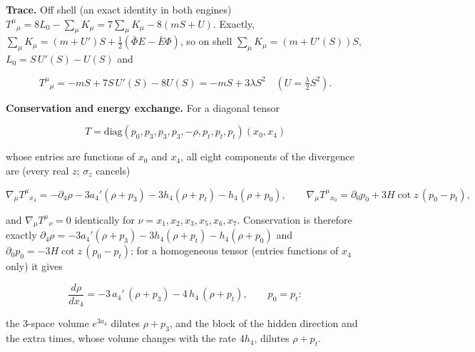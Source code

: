 \documentclass[11pt]{article}
\begin{document}
\textbf{Trace.} Off shell (an exact identity in both engines) $T^\mu{}_\mu = 8L_0 - \sum_\mu K_\mu = 7\sum_\mu K_\mu - 8(mS + U)$. Exactly, $\sum_\mu K_\mu = (m + U')S + \tfrac12(\bar\Phi E - \bar E\Phi)$, so on shell $\sum_\mu K_\mu = (m + U'(S))S$, $L_0 = S\,U'(S) - U(S)$ and

\[
T^\mu{}_\mu = -mS + 7S\,U'(S) - 8U(S) = -mS + 3\lambda S^2 \quad (U = \tfrac{\lambda}{2}S^2) .
\]

\textbf{Conservation and energy exchange.} For a diagonal tensor

\[
T = \mathrm{diag}(p_0, p_3, p_3, p_3, -\rho, p_t, p_t, p_t)(x_0, x_4)
\]

whose entries are functions of $x_0$ and $x_4$, all eight components of the divergence are (every real $z$; $\sigma_z$ cancels)

\[
\nabla_\mu T^\mu{}_{x_4} = -\partial_4\rho - 3a_4'(\rho + p_3) - 3h_4(\rho + p_t) - h_4(\rho + p_0), \qquad \nabla_\mu T^\mu{}_{x_0} = \partial_0 p_0 + 3H\cot z\,(p_0 - p_t),
\]

and $\nabla_\mu T^\mu{}_\nu = 0$ identically for $\nu = x_1, x_2, x_3, x_5, x_6, x_7$. Conservation is therefore exactly $\partial_4\rho = -3a_4'(\rho + p_3) - 3h_4(\rho + p_t) - h_4(\rho + p_0)$ and $\partial_0 p_0 = -3H\cot z\,(p_0 - p_t)$; for a homogeneous tensor (entries functions of $x_4$ only) it gives

\[
\frac{d\rho}{dx_4} = -3\,a_4'\,(\rho + p_3) - 4\,h_4\,(\rho + p_t), \qquad p_0 = p_t :
\]

the 3-space volume $e^{3a_4}$ dilutes $\rho + p_3$, and the block of the hidden direction and the extra times, whose volume changes with the rate $4h_4$, dilutes $\rho + p_t$.
\end{document}

